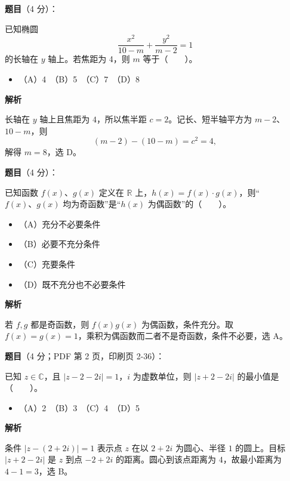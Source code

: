 \begin{answer}

\textbf{题目}（4 分）：

已知椭圆
\nopagebreak[4]
\[
\frac{x^2}{10-m}+\frac{y^2}{m-2}=1
\]
的长轴在 \(y\) 轴上。若焦距为 4，则 \(m\) 等于\mbox{（　　）}。

\begin{itemize}
\item （A）4　（B）5　（C）7　（D）8
\end{itemize}

\textbf{解析}

长轴在 $y$ 轴上且焦距为 $4$，所以焦半距 $c=2$。记长、短半轴平方为 $m-2$、$10-m$，则
\nopagebreak[4]
\[
(m-2)-(10-m)=c^2=4,
\]
解得 $m=8$，选 D。


\end{answer}
\begin{answer}

\textbf{题目}（4 分）：

已知函数 \(f(x)\text{、}g(x)\) 定义在 \(\mathbb R\) 上，\(h(x)=f(x)\cdot g(x)\)，则“\(f(x)\text{、}g(x)\) 均为奇函数”是“\(h(x)\) 为偶函数”的\mbox{（　　）}。

\begin{itemize}
\item （A）充分不必要条件
\item （B）必要不充分条件
\item （C）充要条件
\item （D）既不充分也不必要条件
\end{itemize}

\textbf{解析}

若 $f,g$ 都是奇函数，则 $f(x)g(x)$ 为偶函数，条件充分。取 $f(x)=g(x)=1$，乘积为偶函数而二者不是奇函数，条件不必要，选 A。


\end{answer}
\begin{answer}

\textbf{题目}（4 分；PDF 第 2 页，印刷页 2-36）：

已知 \(z\in\mathbb C\)，且 \(|z-2-2i|=1\)，\(i\) 为虚数单位，则 \(|z+2-2i|\) 的最小值是\mbox{（　　）}。

\begin{itemize}
\item （A）2　（B）3　（C）4　（D）5
\end{itemize}

\textbf{解析}

条件 $|z-(2+2i)|=1$ 表示点 $z$ 在以 $2+2i$ 为圆心、半径 $1$ 的圆上。目标 $|z+2-2i|$ 是 $z$ 到点 $-2+2i$ 的距离。圆心到该点距离为 $4$，故最小距离为 $4-1=3$，选 B。


\end{answer}
